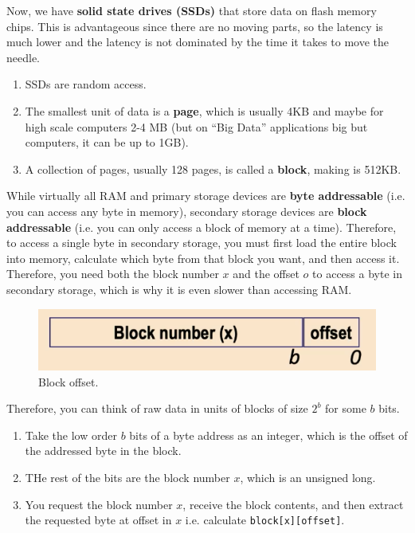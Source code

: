 \documentclass{article}
\begin{document}
    \begin{definition}
      Now, we have \textbf{solid state drives (SSDs)} that store data on flash memory chips. This is advantageous since there are no moving parts, so the latency is much lower and the latency is not dominated by the time it takes to move the needle. 
      \begin{enumerate}
        \item SSDs are random access. 
        \item The smallest unit of data is a \textbf{page}, which is usually 4KB and maybe for high scale computers 2-4 MB (but on ``Big Data'' applications big but computers, it can be up to 1GB). 
        \item A collection of pages, usually 128 pages, is called a \textbf{block}, making is 512KB. 
      \end{enumerate}
    \end{definition}

    While virtually all RAM and primary storage devices are \textbf{byte addressable} (i.e. you can access any byte in memory), secondary storage devices are \textbf{block addressable} (i.e. you can only access a block of memory at a time). Therefore, to access a single byte in secondary storage, you must first load the entire block into memory, calculate which byte from that block you want, and then access it. Therefore, you need both the block number $x$ and the offset $o$ to access a byte in secondary storage, which is why it is even slower than accessing RAM. 

    \begin{figure}[H]
      \centering 
      \includegraphics[scale=0.4]{img/block_offset.png}
      \caption{Block offset.} 
      \label{fig:block_offset}
    \end{figure}

    Therefore, you can think of raw data in units of blocks of size $2^b$ for some $b$ bits. 
    \begin{enumerate}
      \item Take the low order $b$ bits of a byte address as an integer, which is the offset of the addressed byte in the block. 
      \item THe rest of the bits are the block number $x$, which is an unsigned long. 
      \item You request the block number $x$, receive the block contents, and then extract the requested byte at offset in $x$ i.e. calculate \texttt{block[x][offset]}. 
    \end{enumerate}
\end{document}
